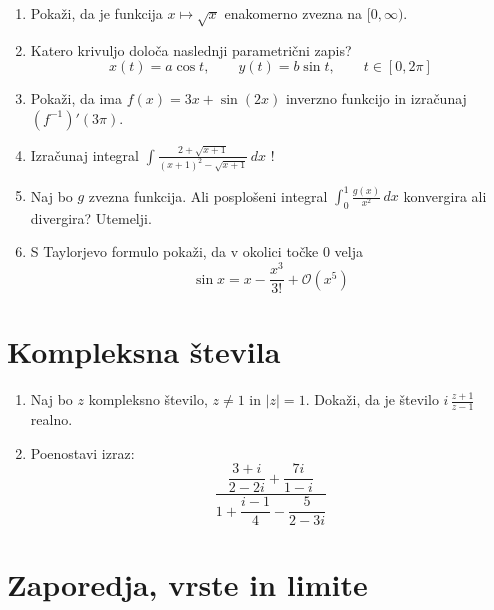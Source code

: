 \documentclass[a4paper,12pt]{article}
\begin{document}
\begin{enumerate}
\item
Pokaži, da je funkcija \(x \mapsto \sqrt{x}\) enakomerno zvezna na \([0, \infty)\).

\item
Katero krivuljo določa naslednji parametrični zapis?
\[
x(t) = a \cos t, \qquad
y(t) = b \sin t, \qquad
t \in [0, 2 \pi]
\]

\item
Pokaži, da ima \(f(x) = 3x + \sin (2x)\) inverzno funkcijo in izračunaj \((f^{-1})'(3 \pi)\).

\item
Izračunaj integral
\(
    \displaystyle
    \int \frac{2+\sqrt{x+1}}{(x+1)^2-\sqrt{x+1}} \, dx
\)\! !

\item
Naj bo \(g\) zvezna funkcija. Ali posplošeni integral
\(\int_{0}^{1} \frac{g(x)}{x^2} \, dx\)
konvergira ali divergira? Utemelji.

\item
S Taylorjevo formulo pokaži, da v okolici točke \(0\) velja
\[\sin x = x- \frac{x^3}{3!} + \mathcal{O} (x^5)\]
\end{enumerate}

\section*{Kompleksna števila}

\begin{enumerate}
\item
Naj bo \(z\) kompleksno število, \(z \ne 1\) in \(\lvert z \rvert = 1\).
Dokaži, da je število \( i \, \frac{z+1}{z-1} \) realno.

\item
Poenostavi izraz:
\[\frac{\dfrac{3 + i}{2 - 2i} + \dfrac{7i}{1 - i}}{1 + \dfrac{i-1}{4} - \dfrac{5}{2 - 3i}}\]
\end{enumerate}

\section*{Zaporedja, vrste in limite}
\end{document}
